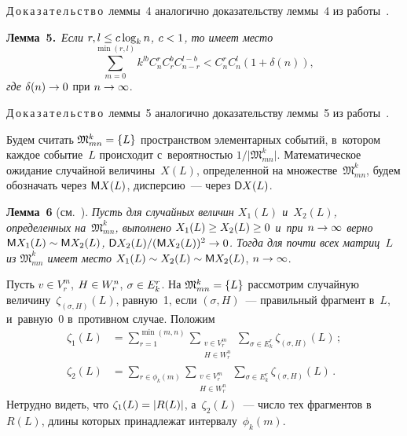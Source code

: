 \begin{multicols}{2}
  
  \noindent
  Д\,о\,к\,а\,з\,а\,т\,е\,л\,ь\,с\,т\,в\,о\  леммы~4 аналогично 
доказательству леммы~4 из работы~\cite{6-duk}.
  
  \smallskip
  
  \noindent
  \textbf{Лемма~5.}\ \textit{Если $r,l\hm\leq c\log_k n$, $c\hm<1$, то имеет 
место}
  $$
  \sum\limits_{m=0}^{\min(r,l)} k^{lb} C_n^r C_r^b C_{n-r}^{l-b} < C_n^r C_n^l 
(1+\delta(n)),
  $$
\textit{где} $\delta(n)\hm\to 0$ при $n\hm\to \infty$.

\smallskip

  \noindent
  Д\,о\,к\,а\,з\,а\,т\,е\,л\,ь\,с\,т\,в\,о\   леммы~5 аналогично 
доказательству леммы~5 из работы~\cite{6-duk}.
  
  \smallskip
  
  Будем считать $\mathfrak{M}^k_{mn}\hm= \{L\}$ пространством 
элементарных событий, в~котором каждое событие~$L$ происходит 
с~вероятностью $1/\vert \mathfrak{M}^k_{mn}\vert$. Математическое ожидание случайной величины~$X(L)$, 
определенной на множестве~$\mathfrak{M}^k_{mn}$, будем обозначать через 
${\sf M}X(L)$, дисперсию~--- через ${\sf D}X(L)$.
  
  \smallskip
  
  \noindent
  \textbf{Лемма~6} (см.~\cite{11-duk}). \textit{Пусть для случайных величин 
$X_1(L)$ и~$X_2(L)$, определенных на~$\mathfrak{M}^k_{mn}$, выполнено 
$X_1(L)\hm\geq X_2(L)\hm\geq 0$ и~при $n\hm\to \infty$ верно ${\sf M}X_1(L)\sim 
{\sf M}X_2(L)$, ${\sf D}X_2(L)/({\sf M}X_2(L))^2\hm\to 0$. Тогда для почти всех матриц~$L$ из 
$\mathfrak{M}^k_{mn}$ имеет место} $X_1(L)\sim X_2(L)\sim {\sf M}X_2(L)$, 
$n\hm\to \infty$.
  
  \smallskip
  
  Пусть $v\in V_r^m$, $H\hm\in W_r^n$, $\sigma\hm\in E_k^r$. На 
$\mathfrak{M}^k_{mn}\hm= \{L\}$ рассмотрим случайную 
величину~$\zeta_{(\sigma,H)}(L)$, равную~1, если $(\sigma,H)$~--- правильный 
фрагмент в~$L$, и~равную~0 в~противном случае. Положим
  \begin{align*}
  \zeta_1(L)&= \sum\limits_{r=1}^{\min(m,n)} \sum\limits_{\substack{{v\in V_r^m}\\ {H\in  W_r^n}}}
\sum\limits_{\sigma\in E_k^r} \zeta_{(\sigma,H)}(L)\,;\\
  \zeta_2(L) &= \sum\limits_{r\in \phi_k(m)}
   \sum\limits_{\substack{{v\in V_r^m}\\ {H\in  W_r^n}}} \sum\limits_{\sigma\in E_k^r}\zeta_{(\sigma,H)} (L)\,.
  \end{align*}
  Нетрудно видеть, что $\zeta_1(L)\hm= \vert R(L)\vert$, а~$\zeta_2(L)$~--- 
число тех фрагментов в~$R(L)$, длины которых принадлежат 
интервалу~$\phi_k(m)$.
  

\end{multicols}
